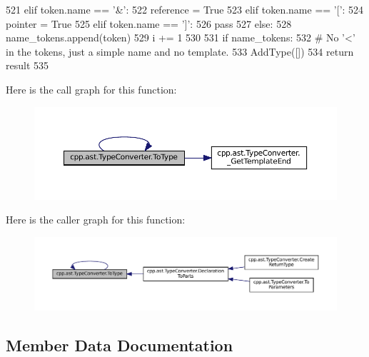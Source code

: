 \begin{DoxyCode}
521             \textcolor{keywordflow}{elif} token.name == \textcolor{stringliteral}{'&'}:
522                 reference = \textcolor{keyword}{True}
523             \textcolor{keywordflow}{elif} token.name == \textcolor{stringliteral}{'['}:
524                pointer = \textcolor{keyword}{True}
525             \textcolor{keywordflow}{elif} token.name == \textcolor{stringliteral}{']'}:
526                 \textcolor{keywordflow}{pass}
527             \textcolor{keywordflow}{else}:
528                 name\_tokens.append(token)
529             i += 1
530 
531         \textcolor{keywordflow}{if} name\_tokens:
532             \textcolor{comment}{# No '<' in the tokens, just a simple name and no template.}
533             AddType([])
534         \textcolor{keywordflow}{return} result
535 
\end{DoxyCode}
Here is the call graph for this function\+:
\nopagebreak
\begin{figure}[H]
\begin{center}
\leavevmode
\includegraphics[width=350pt]{classcpp_1_1ast_1_1TypeConverter_aa6ea82e40cd30e5dfcd471ff144a19cf_cgraph}
\end{center}
\end{figure}
Here is the caller graph for this function\+:
\nopagebreak
\begin{figure}[H]
\begin{center}
\leavevmode
\includegraphics[width=350pt]{classcpp_1_1ast_1_1TypeConverter_aa6ea82e40cd30e5dfcd471ff144a19cf_icgraph}
\end{center}
\end{figure}


\subsection{Member Data Documentation}
\mbox{\label{classcpp_1_1ast_1_1TypeConverter_abb739f15c6cd0800e07c086c2b30833e}} 
